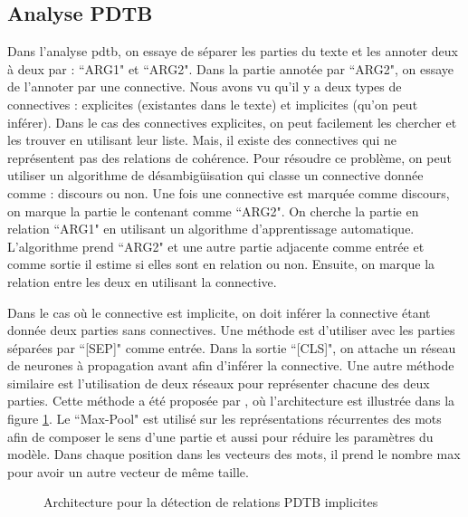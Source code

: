 \documentclass{KodeBook}
\begin{document}
\subsection{Analyse PDTB}

Dans l'analyse \ac{pdtb}, on essaye de séparer les parties du texte et les annoter deux à deux par : ``ARG1" et ``ARG2". 
Dans la partie annotée par ``ARG2", on essaye de l'annoter par une connective. 
Nous avons vu qu'il y a deux types de connectives : explicites (existantes dans le texte) et implicites (qu'on peut inférer). 
Dans le cas des connectives explicites, on peut facilement les chercher et les trouver en utilisant leur liste. 
Mais, il existe des connectives qui ne représentent pas des relations de cohérence. 
Pour résoudre ce problème, on peut utiliser un algorithme de désambigüisation qui classe un connective donnée comme : discours ou non. 
Une fois une connective est marquée comme discours, on marque la partie le contenant comme ``ARG2". 
On cherche la partie en relation ``ARG1" en utilisant un algorithme d'apprentissage automatique. 
L'algorithme prend ``ARG2" et une autre partie adjacente comme entrée et comme sortie il estime si elles sont en relation ou non. 
Ensuite, on marque la relation entre les deux en utilisant la connective. 

Dans le cas où le connective est implicite, on doit inférer la connective étant donnée deux parties sans connectives. 
Une méthode est d'utiliser  avec les parties séparées par ``[SEP]" comme entrée. 
Dans la sortie ``[CLS]", on attache un réseau de neurones à propagation avant afin d'inférer la connective.
Une autre méthode similaire est l'utilisation de deux réseaux  pour représenter chacune des deux parties. 
Cette méthode a été proposée par \citet{2020-liang-al}, où l'architecture est illustrée dans la figure \ref{fig:pdtb-liang}.
Le ``Max-Pool" est utilisé sur les représentations récurrentes des mots afin de composer le sens d'une partie et aussi pour réduire les paramètres du modèle.
Dans chaque position dans les vecteurs des mots, il prend le nombre max pour avoir un autre vecteur de même taille.

\begin{figure}[!ht]
	\centering
	\caption[Architecture pour la détection de relations PDTB implicites]{Architecture pour la détection de relations PDTB implicites \cite{2020-liang-al}}
	\label{fig:pdtb-liang}
\end{figure}
\end{document}
